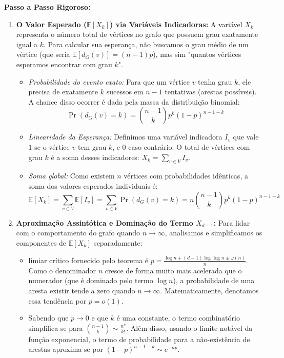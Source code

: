 \documentclass[11pt, a4paper]{article}
\begin{document}
\textbf{Passo a Passo Rigoroso:}
\begin{enumerate}
    \item \textbf{O Valor Esperado ($\mathbb{E}[X_k]$) via Variáveis Indicadoras:} 
    A variável $X_k$ representa o número total de vértices no grafo que possuem grau exatamente igual a $k$. Para calcular sua esperança, não buscamos o grau médio de um vértice (que seria $\mathbb{E}[d_G(v)] = (n-1)p$), mas sim "quantos vértices esperamos encontrar com grau $k$".
    \begin{itemize}
        \item \textit{Probabilidade do evento exato:} Para que um vértice $v$ tenha grau $k$, ele precisa de exatamente $k$ sucessos em $n-1$ tentativas (arestas possíveis). A chance disso ocorrer é dada pela massa da distribuição binomial:
        \[ \Pr(d_G(v) = k) = \binom{n-1}{k} p^k (1-p)^{n-1-k} \]
        \item \textit{Linearidade da Esperança:} Definimos uma variável indicadora $I_v$ que vale $1$ se o vértice $v$ tem grau $k$, e $0$ caso contrário. O total de vértices com grau $k$ é a soma desses indicadores: $X_k = \sum_{v \in V} I_v$.
        \item \textit{Soma global:} Como existem $n$ vértices com probabilidades idênticas, a soma dos valores esperados individuais é:
        \[ \mathbb{E}[X_k] = \sum_{v \in V} \mathbb{E}[I_v] = \sum_{v \in V} \Pr(d_G(v) = k) = n \binom{n-1}{k} p^k (1-p)^{n-1-k} \]
    \end{itemize}
    
    \item \textbf{Aproximação Assintótica e Dominação do Termo $X_{d-1}$:} 
     Para lidar com o comportamento do grafo quando $n \to \infty$, analisamos e simplificamos os componentes de $\mathbb{E}[X_k]$ separadamente:
    \begin{itemize}
        \item limiar crítico fornecido pelo teorema é $p = \frac{\log n + (d-1)\log\log n \pm \omega(n)}{n}$. Como o denominador $n$ cresce de forma muito mais acelerada que o numerador (que é dominado pelo termo $\log n$), a probabilidade de uma aresta existir tende a zero quando $n \to \infty$. Matematicamente, denotamos essa tendência por $p = o(1)$.
        
        \item Sabendo que $p \to 0$ e que $k$ é uma constante, o termo combinatório simplifica-se para $\binom{n-1}{k} \sim \frac{n^k}{k!}$. Além disso, usando o limite notável da função exponencial, o termo de probabilidade para a não-existência de arestas aproxima-se por $(1-p)^{n-1-k} \sim e^{-np}$.
        

\end{itemize}
\end{enumerate}
\end{document}
